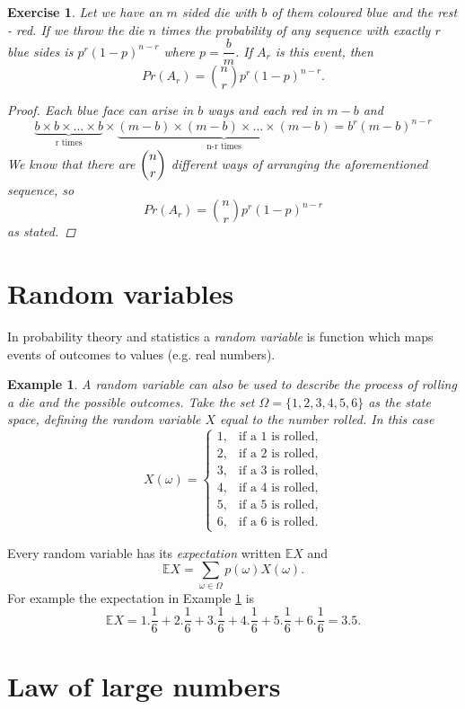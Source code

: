\documentclass[12pt, a4paper,leqno]{report}
\theoremstyle{normal}
\newtheorem{exercise}{Exercise}[chapter]
\theoremstyle{normal}
\newtheorem{example}{Example}[chapter]
\def\expect{\mathbb{E}}
\begin{document}
	\begin{exercise}
		 Let we have an $m$ sided die with $b$ of them coloured blue and the rest - red. If we throw the die $n$ times the probability of any sequence with exactly $r$ blue sides is $p^r(1-p)^{n-r}$ where $p = \dfrac{b}{m}$.
		 If $A_r$ is this event, then
		 \[ Pr(A_r) = \binom{n}{r}p^r(1-p)^{n-r}. \]
		 \begin{proof}
		 	Each blue face can arise in $b$ ways and each red in $m-b$ and
		 	\[ \underbrace{b\times b\times\dots\times b}_{\mbox{r times}}\times \underbrace{(m-b)\times (m-b)\times\dots\times (m-b)}_{\mbox{n-r times}} = b^r(m-b)^{n-r} \]
		 	We know that there are $\dbinom{n}{r}$ different ways of arranging the aforementioned sequence, so
		 	\[ Pr(A_r) = \binom{n}{r}p^r(1-p)^{n-r} \]
		 	as stated.
		 \end{proof}
	\end{exercise}
	
	\section{Random variables}
	In probability theory and statistics a \textit{random variable} is function which maps events of outcomes to values (e.g. real numbers). 
	
	\begin{example}
		\label{ex:die_x}
		A random variable can also be used to describe the process of rolling a die and the possible outcomes. Take the set $\Omega = \lbrace 1, 2, 3, 4, 5, 6\rbrace$ as the state space, defining the random variable $X$ equal to the number rolled.
		In this case
		\[ X(\omega) = \begin{cases}
			1, & \text{if a 1 is rolled} ,\\
			2, & \text{if a 2 is rolled} ,\\
			3, & \text{if a 3 is rolled} ,\\
			4, & \text{if a 4 is rolled} ,\\
			5, & \text{if a 5 is rolled} ,\\
			6, & \text{if a 6 is rolled} .
		\end{cases} \]
	\end{example}
	
	Every random variable has its \textit{expectation} written $\expect X$ and
	\[ \expect X = \sum\limits_{\omega\in \Omega} p(\omega) X(\omega). \]
	For example the expectation in Example \ref{ex:die_x} is
	\[ \expect X = 1.\frac{1}{6} + 2.\frac{1}{6} + 3.\frac{1}{6} + 4.\frac{1}{6} + 5.\frac{1}{6} + 6.\frac{1}{6} = 3.5 . \]
	
	\section{Law of large numbers}
	
\end{document}
